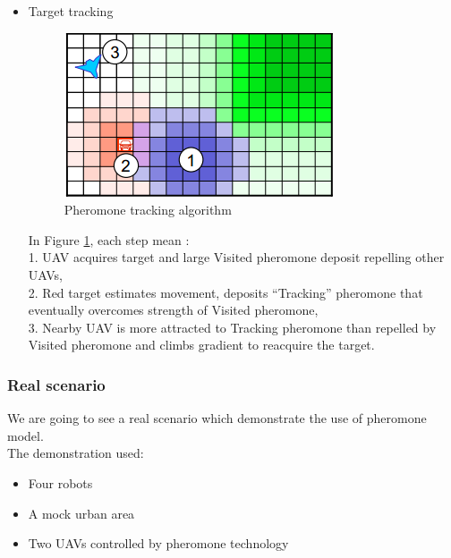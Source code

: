 \begin{itemize}
\item Target tracking

\begin{figure}[h]
\center
\includegraphics[scale=0.7]{../images/pheromone_tracking.png}
\caption{\label{tracking} Pheromone tracking algorithm\cite{PerformanceOfDigitalPheromones10}}
\end{figure}

In Figure \ref{tracking}, each step mean :\\
1. UAV acquires target and large Visited pheromone deposit repelling 
other UAVs,\\
2. Red target estimates movement, deposits “Tracking” pheromone that eventually overcomes strength of Visited pheromone, \\
3. Nearby UAV is more attracted to Tracking pheromone than repelled by Visited pheromone and climbs gradient to reacquire the target. 
\end{itemize}

\subsubsection{Real scenario}

We are going to see a real scenario which demonstrate the use of pheromone model.\\
The demonstration used: 

\begin{itemize}
\item Four robots 
\item A mock urban area  
\item Two UAVs controlled by pheromone technology 
\end{itemize}

